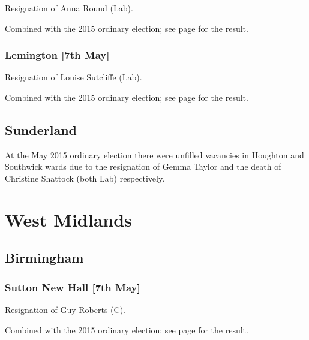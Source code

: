 \documentclass[a4paper,openany]{book}
\begin{document}
\begin{resultsiii}

Resignation of Anna Round (Lab).

Combined with the 2015 ordinary election; see page \pageref{DentonNewcastleTyne} for the result.

\subsubsection*{Lemington \hspace*{\fill}\nolinebreak[1]%
\enspace\hspace*{\fill}
[7th May]}


Resignation of Louise Sutcliffe (Lab).

Combined with the 2015 ordinary election; see page \pageref{LemingtonNewcastleTyne} for the result.

\subsection*{Sunderland}

At the May 2015 ordinary election there were unfilled vacancies in Houghton and Southwick wards due to the resignation of Gemma Taylor and the death of Christine Shattock (both Lab) respectively.

\section{West Midlands}

\subsection*{Birmingham}

\subsubsection*{Sutton New Hall \hspace*{\fill}\nolinebreak[1]%
\enspace\hspace*{\fill}
[7th May]}


Resignation of Guy Roberts (C).

Combined with the 2015 ordinary election; see page \pageref{SuttonNewHallBirmingham} for the result.


\end{resultsiii}
\end{document}
